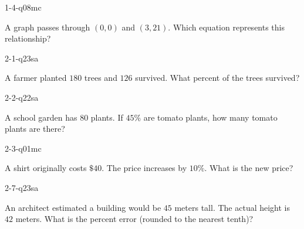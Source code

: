 
\begin{practiceQuestion}{1-4-q08}{mc}
\begin{questionText}
A graph passes through $(0, 0)$ and $(3, 21)$. Which equation represents this relationship?
\end{questionText}
\end{practiceQuestion}

\begin{practiceQuestion}{2-1-q23}{sa}
\begin{questionText}
A farmer planted $180$ trees and $126$ survived. What percent of the trees survived?
\end{questionText}
\end{practiceQuestion}

\begin{practiceQuestion}{2-2-q22}{sa}
\begin{questionText}
A school garden has $80$ plants. If $45\%$ are tomato plants, how many tomato plants are there?
\end{questionText}
\end{practiceQuestion}

\begin{practiceQuestion}{2-3-q01}{mc}
\begin{questionText}
A shirt originally costs $\$40$. The price increases by $10\%$. What is the new price?
\end{questionText}
\end{practiceQuestion}

\begin{practiceQuestion}{2-7-q23}{sa}
\begin{questionText}
An architect estimated a building would be $45$ meters tall. The actual height is $42$ meters. What is the percent error (rounded to the nearest tenth)?
\end{questionText}
\end{practiceQuestion}


